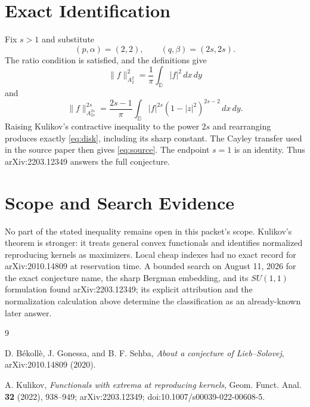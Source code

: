 \documentclass[11pt]{article}
\begin{document}
\section*{Exact Identification}

Fix $s>1$ and substitute
\[
 (p,\alpha)=(2,2),\qquad (q,\beta)=(2s,2s).
\]
The ratio condition is satisfied, and the definitions give
\[
 \|f\|_{A^2_2}^2=\frac1\pi\int_{\mathbb D}|f|^2\,dx\,dy
\]
and
\[
 \|f\|_{A^{2s}_{2s}}^{2s}
 =\frac{2s-1}{\pi}
 \int_{\mathbb D}|f|^{2s}(1-|z|^2)^{2s-2}\,dx\,dy.
\]
Raising Kulikov's contractive inequality to the power $2s$ and rearranging
produces exactly \eqref{eq:disk}, including its sharp constant. The Cayley
transfer used in the source paper then gives \eqref{eq:source}. The endpoint
$s=1$ is an identity. Thus arXiv:2203.12349 answers the full conjecture.

\section*{Scope and Search Evidence}

No part of the stated inequality remains open in this packet's scope.
Kulikov's theorem is stronger: it treats general convex functionals and
identifies normalized reproducing kernels as maximizers. Local cheap indexes
had no exact record for arXiv:2010.14809 at reservation time. A bounded search
on August 11, 2026 for the exact conjecture name, the sharp Bergman embedding,
and its $SU(1,1)$ formulation found arXiv:2203.12349; its explicit attribution
and the normalization calculation above determine the classification as an
already-known later answer.

\begin{thebibliography}{9}

D. B\'ekoll\`e, J. Gonessa, and B. F. Sehba,
\emph{About a conjecture of Lieb--Solovej}, arXiv:2010.14809 (2020).

A. Kulikov,
\emph{Functionals with extrema at reproducing kernels},
Geom. Funct. Anal. \textbf{32} (2022), 938--949;
arXiv:2203.12349; doi:10.1007/s00039-022-00608-5.

\end{thebibliography}
\end{document}
